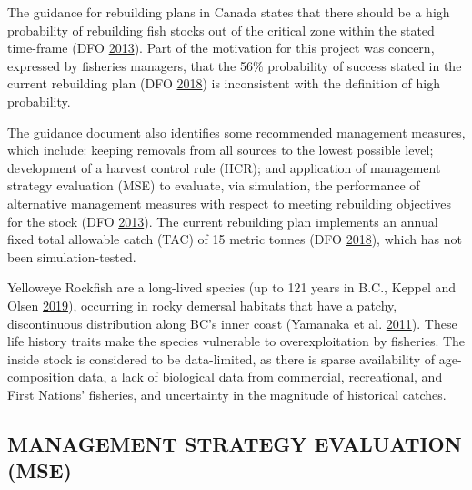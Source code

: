 \documentclass[11pt]{book}
\begin{document}
The guidance for rebuilding plans in Canada states that there should be a high probability of rebuilding fish stocks out of the critical zone within the stated time-frame (DFO \protect\hyperlink{ref-dfo2013}{2013}). Part of the motivation for this project was concern, expressed by fisheries managers, that the 56\% probability of success stated in the current rebuilding plan (DFO \protect\hyperlink{ref-ifmp2018}{2018}) is inconsistent with the definition of high probability.

The guidance document also identifies some recommended management measures, which include: keeping removals from all sources to the lowest possible level; development of a harvest control rule (HCR); and application of management strategy evaluation (MSE) to evaluate, via simulation, the performance of alternative management measures with respect to meeting rebuilding objectives for the stock (DFO \protect\hyperlink{ref-dfo2013}{2013}). The current rebuilding plan implements an annual fixed total allowable catch (TAC) of 15 metric tonnes (DFO \protect\hyperlink{ref-ifmp2018}{2018}), which has not been simulation-tested.

Yelloweye Rockfish are a long-lived species (up to 121 years in B.C., Keppel and Olsen \protect\hyperlink{ref-keppel2019}{2019}), occurring in rocky demersal habitats that have a patchy, discontinuous distribution along BC's inner coast (Yamanaka et al. \protect\hyperlink{ref-yamanaka2011}{2011}). These life history traits make the species vulnerable to overexploitation by fisheries. The inside stock is considered to be data-limited, as there is sparse availability of age-composition data, a lack of biological data from commercial, recreational, and First Nations' fisheries, and uncertainty in the magnitude of historical catches.

\hypertarget{sec:introduction-mse}{%
\subsection{MANAGEMENT STRATEGY EVALUATION (MSE)}\label{sec:introduction-mse}}
\end{document}
